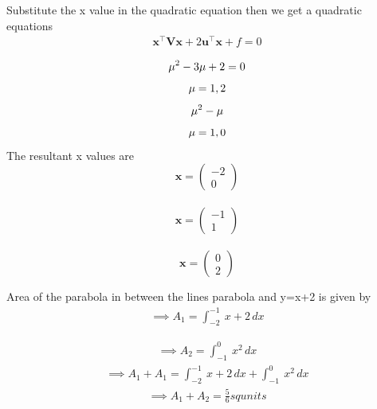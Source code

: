 \documentclass[journal,10pt,twocolumn]{article}
\let\vec\mathbf
\begin{document}
Substitute the x value in the quadratic equation then we get a quadratic equations
\begin{align}
    \label{eq:conic_quad_form}
    \vec{x}^{\top}\vec{V}\vec{x}+2\vec{u}^{\top}\vec{x}+f=0
    \end{align}
    
$$\mu ^{2}-3\mu +2=0\\$$
$$\mu =1,2\\$$
$$\mu ^{2}-\mu\\$$
$$\mu =1,0\\$$
The resultant x values are\\
$$\vec{x}=\begin{pmatrix}
-2\\ 
0
\end{pmatrix}$$\\
$$\vec{x}=\begin{pmatrix}
-1\\ 
1
\end{pmatrix}$$\\
$$\vec{x}=\begin{pmatrix}
0\\ 
2
\end{pmatrix}$$

Area of the parabola in between the lines parabola and y=x+2 is given by
\begin{align}
\implies A_1=\int_{-2}^{-1} \ x+2 \,dx
\end{align}

\begin{align}
\implies A_2=\int_{-1}^{0} \ x^2 \,dx
\end{align}
\begin{align}
\implies A_1+A_1=\int_{-2}^{-1} \ x+2 \,dx+\int_{-1}^{0} \ x^2 \,dx
\end{align}
\begin{align}
\implies A_1+ A_2=\frac{5}{6}sq units
\end{align}



  
\end{document}
